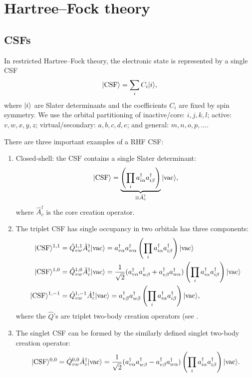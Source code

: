 \documentclass{article}
\begin{document}
\section{Hartree--Fock theory}
\subsection{CSFs}
In restricted Hartree--Fock theory, the electronic state is represented by a single CSF
\begin{equation}
|\mathrm{CSF}\rangle=\sum_iC_i|i\rangle,
\end{equation}
where $|i\rangle$ are Slater determinants and the coefficients $C_i$ are fixed by spin symmetry. We use the orbital partitioning of inactive/core: $i,j,k,l$; active: $v,w,x,y,z$; virtual/secondary: $a,b,c,d,e$; and general: $m,n,o,p,\dots$.

There are three important examples of a RHF CSF:
\begin{enumerate}
    \item Closed-shell: the CSF contains a single Slater determinant:
    \begin{equation}
        |\mathrm{CSF}\rangle=\underbrace{\left( \prod_ia_{i\alpha}^{\dagger}a_{i\beta}^{\dagger} \right)}_{\equiv \hat{A}_c^{\dagger}}|\mathrm{vac}\rangle,
    \end{equation}
    where $\hat{A}_c^{\dagger}$ is the core creation operator.
    \item The triplet CSF has single occupancy in two orbitals has three components:
    \begin{align}
    |\mathrm{CSF}\rangle^{1,1}&=\hat{Q}_{vw}^{1,1}\hat{A}_c^{\dagger}|\mathrm{vac}\rangle=a_{v\alpha}^{\dagger}a_{w\alpha}^{\dagger}\left( \prod_ia_{i\alpha}^{\dagger}a_{i\beta}^{\dagger} \right)|\mathrm{vac}\rangle\\
    |\mathrm{CSF}\rangle^{1,0}&=\hat{Q}_{vw}^{1,0}\hat{A}_c^{\dagger}|\mathrm{vac}\rangle=\frac{1}{\sqrt{2}}(a_{v\alpha}^{\dagger}a_{w\beta}^{\dagger}+a_{v\beta}^{\dagger}a_{w\alpha}^{\dagger})\left( \prod_ia_{i\alpha}^{\dagger}a_{i\beta}^{\dagger} \right)|\mathrm{vac}\rangle\\
    |\mathrm{CSF}\rangle^{1,-1}&=\hat{Q}_{vw}^{1,-1}\hat{A}_c^{\dagger}|\mathrm{vac}\rangle=a_{v\beta}^{\dagger}a_{w\beta}^{\dagger}\left( \prod_ia_{i\alpha}^{\dagger}a_{i\beta}^{\dagger} \right)|\mathrm{vac}\rangle,
    \end{align}
    where the $\hat{Q}$'s are triplet two-body creation operators (see \cite[eq. 2.3.17-2.3.19]{helgakerMolecularElectronicStructure2000}.
    \item The singlet CSF can be formed by the similarly defined singlet two-body creation operator:
    \begin{equation}
    |\mathrm{CSF}\rangle^{0,0}=\hat{Q}_{vw}^{0,0}\hat{A}_c^{\dagger}|\mathrm{vac}\rangle=\frac{1}{\sqrt{2}}(a_{v\alpha}^{\dagger}a_{w\beta}^{\dagger}-a_{v\beta}^{\dagger}a_{w\alpha}^{\dagger})\left( \prod_ia_{i\alpha}^{\dagger}a_{i\beta}^{\dagger} \right)|\mathrm{vac}\rangle.
    \end{equation}
\end{enumerate}
\end{document}
